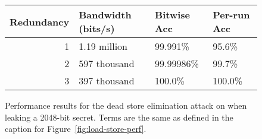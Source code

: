 \documentclass[conference]{IEEEtran}
\theoremstyle{plain}
\theoremstyle{definition}
\begin{document}
\begin{figure}
  \small
  \begin{tabular}{ r | l | l | l }
    Redundancy & Bandwidth (bits/s) & Bitwise Acc & Per-run Acc \\ \hline
    1          & 1.19 million       & 99.991\%    & 95.6\%      \\
    2          & 597 thousand       & 99.99986\%  & 99.7\%      \\
    3          & 397 thousand       & 100.0\%     & 100.0\%     \\
  \end{tabular}
  \caption{
    Performance results for the dead store elimination attack on {\CLANG} when
    leaking a 2048-bit secret.
    Terms are the same as defined in the caption for Figure~\ref{fig:load-store-perf}.
  }
  \label{fig:clang-dse-perf}
\end{figure}
\end{document}
